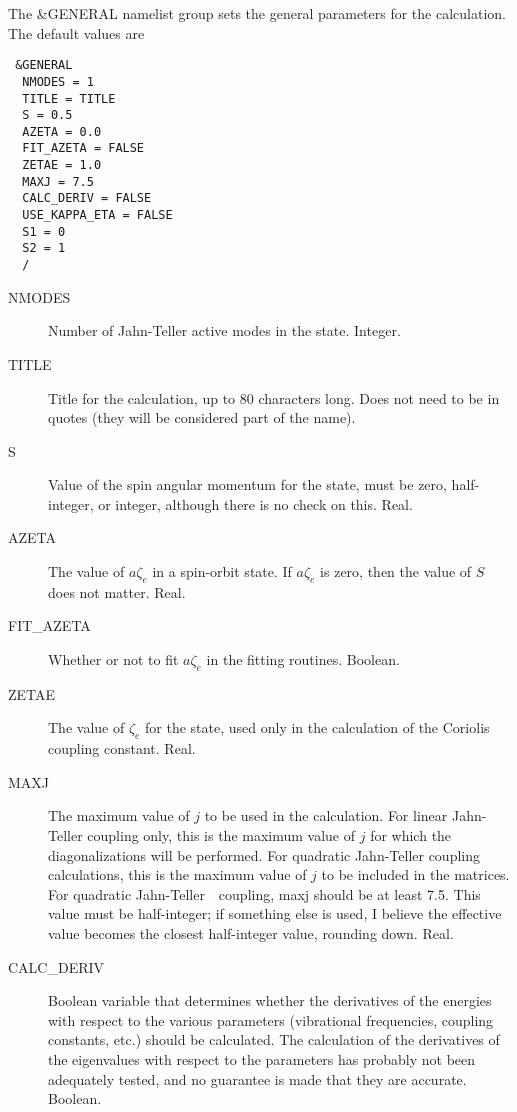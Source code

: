 \documentclass{article}
\newcommand{\JT}{Jahn-Teller\ }
\begin{document}
The \&GENERAL namelist group sets the general parameters for the
calculation. The default values are

\begin{verbatim}
 &GENERAL 
  NMODES = 1
  TITLE = TITLE
  S = 0.5
  AZETA = 0.0
  FIT_AZETA = FALSE
  ZETAE = 1.0
  MAXJ = 7.5
  CALC_DERIV = FALSE
  USE_KAPPA_ETA = FALSE
  S1 = 0
  S2 = 1
  /
\end{verbatim}

\begin{description}

\item[NMODES] Number of Jahn-Teller active modes in the state. Integer.

\item[TITLE] Title for the calculation, up to 80 characters
  long. Does not need to be in quotes (they will be considered part of
  the name). 

\item[S] Value of the spin angular momentum for the state, must be
  zero, half-integer, or integer, although there is no check on this. Real.

\item[AZETA] The value of $a\zeta _e$ in a spin-orbit state. If
  $a\zeta_e$ is zero, then the value of $S$ does not matter. Real.

\item[FIT\_AZETA] Whether or not to fit $a\zeta _e$ in the fitting
  routines. Boolean.

\item[ZETAE] The value of $\zeta _e$ for the state, used only in the
  calculation of the Coriolis coupling constant. Real.

\item[MAXJ] The maximum value of $j$ to be used in the
  calculation. For linear Jahn-Teller coupling only, this is the
  maximum value of $j$ for which the diagonalizations will be
  performed. For quadratic Jahn-Teller coupling calculations, this is
  the maximum value of $j$ to be included in the matrices. For
  quadratic \JT\ coupling, maxj should be at least 7.5. This value
  must be half-integer; if something else is used, I believe the
  effective value becomes the closest half-integer value, rounding
  down. Real.

\item[CALC\_DERIV] Boolean variable that determines whether the
  derivatives of the energies with respect to the various parameters
  (vibrational frequencies, coupling constants, etc.) should be
  calculated. The calculation of the derivatives of the eigenvalues with
  respect to the parameters has probably not been adequately tested,
  and no guarantee is made that they are accurate. Boolean.
  

\end{description}
\end{document}
